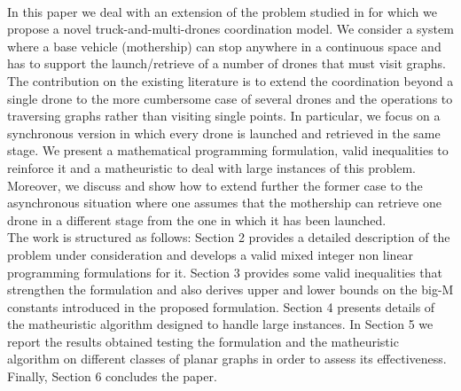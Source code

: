 \\
In this paper we deal with an extension of the problem studied in \cite{art:Amorosi2021} for which we propose a novel truck-and-multi-drones coordination model. We consider a system where a base vehicle (mothership) can stop anywhere in a continuous space and has to support the launch/retrieve of a number of drones that must visit graphs. The contribution on the existing literature is to extend the coordination beyond a single drone to the more cumbersome case of several drones and the operations to traversing graphs rather than visiting single points. In particular, we focus on a synchronous version in which every drone is launched and retrieved in the same stage. We present a mathematical programming formulation, valid inequalities to reinforce it and a matheuristic to deal with large instances of this problem. Moreover, we discuss and show how to extend further the former case to the  asynchronous situation where one assumes that the mothership can retrieve one drone in a different stage from the one in which it has been launched.\\
\noindent
The work is structured as follows: Section 2 provides a detailed description of the problem under consideration and develops a valid mixed integer non linear programming formulations for it. Section 3  provides some valid inequalities that strengthen the formulation and also derives upper and lower bounds on the big-M constants introduced in the proposed formulation. Section 4 presents details of the matheuristic algorithm designed to handle large instances. In Section 5 we report the results obtained testing the formulation and the matheuristic algorithm on different classes of planar graphs in order to assess its effectiveness. Finally, Section 6 concludes the paper.